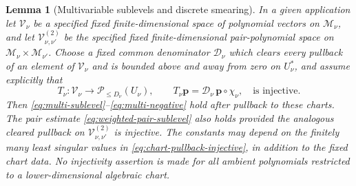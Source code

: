 \documentclass[11pt]{article}
\numberwithin{equation}{section}
\newtheorem{lemma}[theorem]{Lemma}
\theoremstyle{remark}
\theoremstyle{definition}
\begin{document}
\begin{lemma}[Multivariable sublevels and discrete smearing]
In a given application let $\mathcal V_\nu$ be a specified fixed
finite-dimensional space of polynomial vectors on $\mathcal M_\nu$, and
let $\mathcal V^{(2)}_{\nu,\nu'}$ be the specified fixed
finite-dimensional pair-polynomial space on
$\mathcal M_\nu\times\mathcal M_{\nu'}$.
Choose a fixed common denominator $\mathcal D_\nu$ which clears every
pullback of an element of $\mathcal V_\nu$ and is bounded above and away
from zero on $U_\nu^*$, and assume explicitly that
\begin{equation}\label{eq:chart-pullback-injective}
 T_\nu:\mathcal V_\nu\longrightarrow
 \mathcal P_{\le D_\nu}(U_\nu),\qquad
 T_\nu\mathbf p
 =\mathcal D_\nu\,\mathbf p\circ\chi_\nu,
 \quad\text{is injective}.
\end{equation}
Then \eqref{eq:multi-sublevel}--\eqref{eq:multi-negative} hold after
pullback to these charts.  The pair estimate
\eqref{eq:weighted-pair-sublevel} also holds provided the analogous
cleared pullback on $\mathcal V^{(2)}_{\nu,\nu'}$ is injective.  The constants may
depend on the finitely many least singular values in
\eqref{eq:chart-pullback-injective}, in addition to the fixed chart data.
No injectivity assertion is made for all ambient polynomials restricted
to a lower-dimensional algebraic chart.
\end{lemma}
\end{document}
